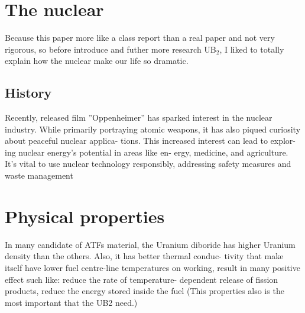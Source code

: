 \documentclass[final,10pt,times,twocolumn]{elsarticle}
\begin{document}
\section{The nuclear}
Because this paper more like a class report than a real paper and not very rigorous, so before
introduce and futher more research UB$_{2}$, I liked to totally
explain how the nuclear make our life so dramatic.

\subsection{History}

Recently, released film ”Oppenheimer” has
sparked interest in the nuclear industry. While
primarily portraying atomic weapons, it has also
piqued curiosity about peaceful nuclear applica-
tions. This increased interest can lead to explor-
ing nuclear energy’s potential in areas like en-
ergy, medicine, and agriculture. It’s vital to use
nuclear technology responsibly, addressing safety
measures and waste management

\section{Physical properties}
In many candidate of ATFs material, the Uranium 
diboride has higher Uranium density than
the others. Also, it has better thermal conduc-
tivity that make itself have lower fuel centre-line
temperatures on working, result in many positive
effect such like: reduce the rate of temperature-
dependent release of fission products, reduce the
energy stored inside the fuel (This properties also
is the most important that the UB2 need.)



\end{document}
